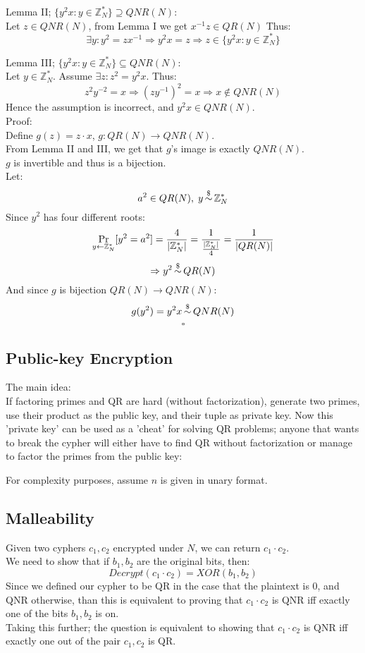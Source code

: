 Lemma II; $\{y^2x:y\in\mathbb{Z}_N^*\}\supseteq QNR(N)$:\\
Let $z\in QNR(N)$, from Lemma I we get $x^{-1}z\in QR(N)$
Thus:
\[
	\exists y: y^2=zx^{-1}
	\Rightarrow y^2x=z
	\Rightarrow z\in\{y^2x:y\in\mathbb{Z}_N^*\}	
\]

Lemma III; $\{y^2x:y\in\mathbb{Z}_N^*\}\subseteq QNR(N)$:\\
Let $y\in\mathbb{Z}_N^*$. Assume $\exists z:z^2=y^2x$.
Thus:
\[
	z^2y^{-2}=x\Rightarrow (zy^{-1})^2=x\Rightarrow x\notin QNR(N)
\]
Hence the assumption is incorrect, and $y^2x\in QNR(N)$.\\

Proof:\\
Define $g(z)=z\cdot x$, $g:QR(N)\longrightarrow QNR(N)$.\\
From Lemma II and III, we get that $g$'s image is exactly $QNR(N)$.\\
$g$ is invertible and thus is a bijection.\\
Let:
\[
	a^2\in QR(N),\;y\operatorname*{\sim}^\$\mathbb{Z}_N^*
\]
Since $y^2$ has four different roots:
\[
	\operatorname*{Pr}_{y\leftarrow \mathbb{Z}_N^*}[y^2=a^2]
	=\frac{4}{|\mathbb{Z}_N^*|}
	=\frac{1}{\frac{|\mathbb{Z}_N^*|}{4}}
	=\frac{1}{|QR(N)|}
\]
\[
	\Rightarrow y^2\operatorname*{\sim}^\$QR(N)
\]
And since $g$ is bijection $QR(N)\rightarrow QNR(N)$:
\[
	g(y^2)=y^2x\operatorname*{\sim}^\$ QNR(N)
\]
\[\square\]

\subsection{Public-key Encryption}
The main idea:\\
If factoring primes and QR are hard (without factorization), generate two primes, use
their product as the public key, and their tuple as private key.
Now this 'private key' can be used as a 'cheat' for solving
QR problems; anyone that wants to break the cypher will either
have to find QR without factorization or manage to factor
the primes from the public key:


For complexity purposes, assume $n$ is given in unary format.

\subsection{Malleability}
Given two cyphers $c_1,c_2$ encrypted under $N$,
we can return $c_1\cdot c_2$.\\
We need to show that if $b_1,b_2$ are the 
original bits, then:
\[
	Decrypt(c_1\cdot c_2)=XOR(b_1,b_2)
\]
Since we defined our cypher to be QR in the case that
the plaintext is 0, and QNR otherwise,
than this is equivalent to proving that
$c_1\cdot c_2$ is QNR iff exactly one of the
bits $b_1,b_2$ is on.\\
Taking this further; the question is equivalent to 
showing that $c_1\cdot c_2$ is QNR iff exactly one out 
of the pair $c_1, c_2$ is QR.\\

